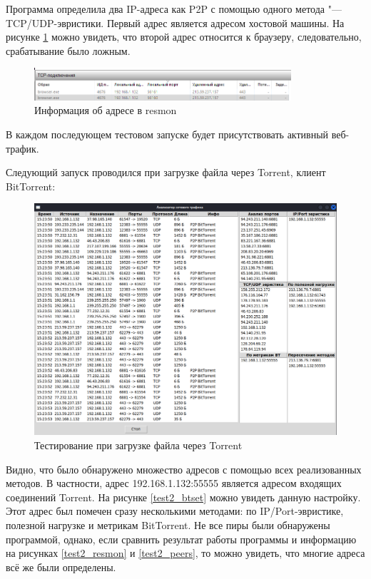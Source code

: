 \documentclass[bachelor, och, coursework]{SCWorks}
\begin{document}
Программа определила два IP-адреса как P2P с помощью одного метода "--- TCP/UDP-эвристики. Первый адрес является адресом хостовой машины. На рисунке \ref{resmon1} можно увидеть, что второй адрес относится к браузеру, следовательно, срабатывание было ложным. 
\begin{figure}[H]
    \centering
    \includegraphics[width=0.85\textwidth]{test1_resmon.png}
    \caption{Информация об адресе в resmon}
    \label{resmon1}
\end{figure}

В каждом последующем тестовом запуске будет присутствовать активный веб-трафик.

Следующий запуск проводился при загрузке файла через \textmu Torrent, клиент BitTorrent:
\begin{figure}[H]
    \centering
    \includegraphics[width=1\textwidth]{test2.png}
    \caption{Тестирование при загрузке файла через \textmu Torrent}
\end{figure}

Видно, что было обнаружено множество адресов с помощью всех реализованных методов. В частности, адрес 192.168.1.132:55555 является адресом входящих соединений \textmu Torrent. На рисунке \ref{test2_btset} можно увидеть данную настройку. Этот адрес был помечен сразу несколькими методами: по IP/Port-эвристике, полезной нагрузке и метрикам BitTorrent. Не все пиры были обнаружены программой, однако, если сравнить результат работы программы и информацию на рисунках \ref{test2_resmon} и \ref{test2_peers}, то можно увидеть, что многие адреса всё же были определены.
\end{document}
